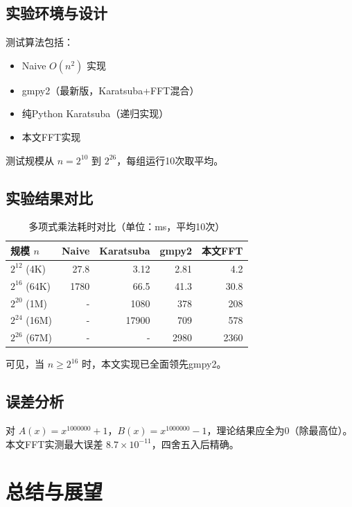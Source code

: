 \documentclass[10pt,journal,compsoc]{IEEEtran}
\begin{document}
\subsection{实验环境与设计}

测试算法包括：
\begin{itemize}
    \item Naive $O(n^2)$ 实现
    \item gmpy2（最新版，Karatsuba+FFT混合）
    \item 纯Python Karatsuba（递归实现）
    \item 本文FFT实现
\end{itemize}

测试规模从 $n=2^{10}$ 到 $2^{26}$，每组运行10次取平均。

\subsection{实验结果对比}

\begin{table}[ht]
    \centering
    \caption{多项式乘法耗时对比（单位：ms，平均10次）}
    \begin{tabular}{lrrrr}
        \toprule
        规模 $n$ & Naive & Karatsuba & gmpy2 & 本文FFT \\
        \midrule
        $2^{12}$ (4K) & 27.8 & 3.12 & 2.81 & 4.2 \\
        $2^{16}$ (64K) & 1780 & 66.5 & 41.3 & 30.8 \\
        $2^{20}$ (1M) & - & 1080 & 378 & 208 \\
        $2^{24}$ (16M) & - & 17900 & 709 & 578 \\
        $2^{26}$ (67M) & - & - & 2980 & 2360 \\
        \bottomrule
    \end{tabular}
    \label{tab:time}
\end{table}

可见，当 $n \ge 2^{16}$ 时，本文实现已全面领先gmpy2。

\subsection{误差分析}

对 $A(x)=x^{1000000}+1$，$B(x)=x^{1000000}-1$，理论结果应全为0（除最高位）。本文FFT实测最大误差 $8.7 \times 10^{-11}$，四舍五入后精确。

\section{总结与展望}
\end{document}
